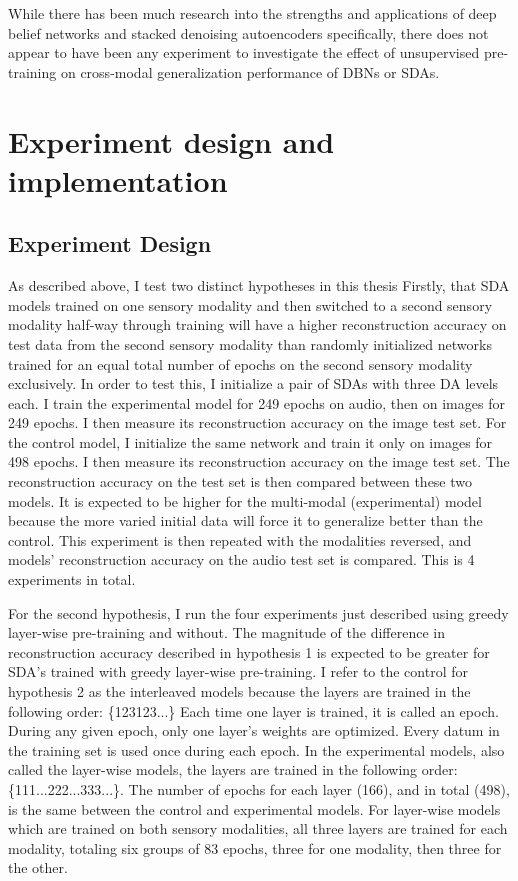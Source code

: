 \documentclass[12pt]{article}
\begin{document}
\begin{doublespacing}
While there has been much research into the strengths and applications of deep belief networks and stacked denoising autoencoders specifically, there does not appear to have been any experiment to investigate the effect of unsupervised pre-training on cross-modal generalization performance of DBNs or SDAs.

	
\section{Experiment design and implementation}

	\subsection{Experiment Design}
	As described above, I test two distinct hypotheses in this thesis Firstly, that SDA models trained on one sensory modality and then switched to a second sensory modality half-way through training will have a higher reconstruction accuracy on test data from the second sensory modality than randomly initialized networks trained for an equal total number of epochs on the second sensory modality exclusively. In order to test this, I initialize a pair of SDAs with three DA levels each. I train the experimental model for 249 epochs on audio, then on images for 249 epochs. I then measure its reconstruction accuracy on the image test set. For the control model, I initialize the same network and train it only on images for 498 epochs. I then measure its reconstruction accuracy on the image test set. The reconstruction accuracy on the test set is then compared between these two models. It is expected to be higher for the multi-modal (experimental) model because the more varied initial data will force it to generalize better than the control. This experiment is then repeated with the modalities reversed, and models' reconstruction accuracy on the audio test set is compared. This is 4 experiments in total. 
	
	For the second hypothesis, I run the four experiments just described using greedy layer-wise pre-training and without. The magnitude of the difference in reconstruction accuracy described in hypothesis 1 is expected to be greater for SDA's trained with greedy layer-wise pre-training. I refer to the control for hypothesis 2 as the interleaved models because the layers are trained in the following order: \{123123...\} Each time one layer is trained, it is called an epoch. During any given epoch, only one layer's weights are optimized. Every datum in the training set is used once during each epoch. In the experimental models, also called the layer-wise models, the layers are trained in the following order: \{111...222...333...\}. The number of epochs for each layer (166), and in total (498), is the same between the control and experimental models. For layer-wise models which are trained on both sensory modalities, all three layers are trained for each modality, totaling six groups of 83 epochs, three for one modality, then three for the other.
	

\end{doublespacing}
\end{document}
